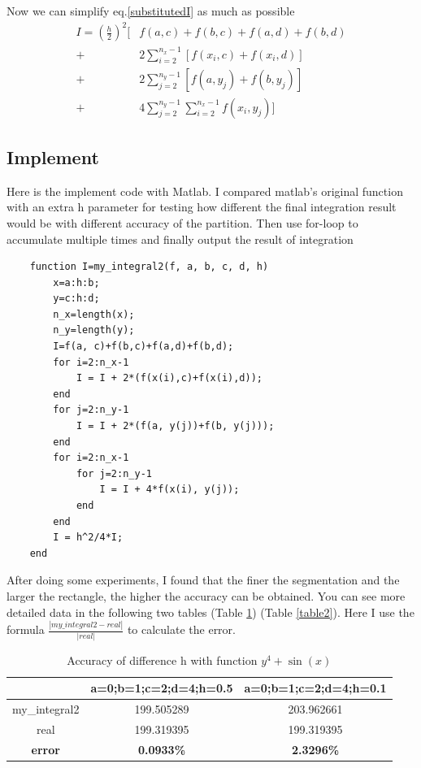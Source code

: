 \documentclass[
	12pt, %
]{fphw}
\numberwithin{equation}{section}
\numberwithin{figure}{section}
\numberwithin{table}{section}
\begin{document}
Now we can simplify eq.\eqref{substitutedI} as much as possible
\begin{equation}
	\begin{aligned}
		I = (\frac{h}{2})^2[ & f(a, c)+f(b, c)+f(a, d)+f(b, d)                   \\
		+                    & 2\sum^{n_x-1}_{i=2}[f(x_i, c)+f(x_i, d)]          \\
		+                    & 2\sum^{n_y-1}_{j=2}[f(a, y_j)+f(b, y_j)]          \\
		+                    & 4\sum^{n_y-1}_{j=2}\sum^{n_x-1}_{i=2}f(x_i, y_j)]
	\end{aligned}
\end{equation}


\subsection*{Implement}

Here is the implement code with Matlab. I compared matlab's original function with an extra h parameter for testing how different the final integration result would be with different accuracy of the partition. Then use for-loop to accumulate multiple times and finally output the result of integration

\begin{lstlisting}
	function I=my_integral2(f, a, b, c, d, h)
		x=a:h:b;
		y=c:h:d;
		n_x=length(x);
		n_y=length(y);
		I=f(a, c)+f(b,c)+f(a,d)+f(b,d);
		for i=2:n_x-1
			I = I + 2*(f(x(i),c)+f(x(i),d));
		end
		for j=2:n_y-1
			I = I + 2*(f(a, y(j))+f(b, y(j)));
		end
		for i=2:n_x-1
			for j=2:n_y-1
				I = I + 4*f(x(i), y(j));
			end
		end
		I = h^2/4*I;
	end
\end{lstlisting}

After doing some experiments, I found that the finer the segmentation and the larger the rectangle, the higher the accuracy can be obtained. You can see more detailed data in the following two tables (Table \ref{table1}) (Table \ref{table2}).
Here I use the formula $\frac{\left\lvert my\_integral2-real\right\rvert }{\left\lvert real\right\rvert }$ to calculate the error.

\begin{table}
	\centering
	\caption{Accuracy of difference h with function $y^4+\sin(x)$}
	\label{table1}
	\begin{tabular}{ccc}
		\toprule
		               & a=0;b=1;c=2;d=4;h=0.5 & a=0;b=1;c=2;d=4;h=0.1 \\
		\midrule
		my\_integral2  & 199.505289            & 203.962661            \\
		real           & 199.319395            & 199.319395            \\
		\textbf{error} & \textbf{0.0933\%}     & \textbf{2.3296\%}     \\
		\bottomrule
	\end{tabular}
\end{table}
\end{document}
